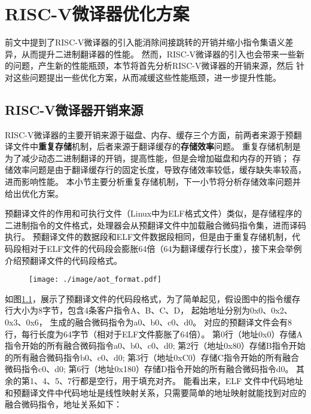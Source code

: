 \chapter{RISC-V微译器优化方案}\label{chap:Opt}

前文中提到了RISC-V微译器的引入能消除间接跳转的开销并缩小指令集语义差异，从而提升二进制翻译器的性能。
然而，RISC-V微译器的引入也会带来一些新的问题，产生新的性能瓶颈，本节将首先分析RISC-V微译器的开销来源，然后
针对这些问题提出一些优化方案，从而减缓这些性能瓶颈，进一步提升性能。




\section{RISC-V微译器开销来源}
RISC-V微译器的主要开销来源于磁盘、内存、缓存三个方面，前两者来源于预翻译文件中\textbf{重复存储}机制，后者来源于翻译缓存的\textbf{存储效率}问题。
重复存储机制是为了减少动态二进制翻译的开销，提高性能，但是会增加磁盘和内存的开销；
存储效率问题是由于翻译缓存行的固定长度，导致存储效率较低，缓存缺失率较高，进而影响性能。
本小节主要分析重复存储机制，下一小节将分析存储效率问题并给出优化方案。

预翻译文件的作用和可执行文件（Linux中为ELF格式文件）类似，是存储程序的二进制指令的文件格式，处理器会从预翻译文件中加载融合微码指令集，进而译码执行。
预翻译文件的数据段和ELF文件数据段相同，但是由于重复存储机制，代码段相对于ELF文件的代码段会膨胀64倍（64为翻译缓存行长度），接下来会举例介绍预翻译文件的代码段格式。

\begin{figure}[!htbp]
  \centering
  \texttt{[image: ./image/aot\_format.pdf]}
  \label{img:aot_format}
\end{figure}

如图\ref{img:aot_format}，展示了预翻译文件的代码段格式，为了简单起见，假设图中的指令缓存行大小为8字节，包含4条客户指令A、B、C、D，
起始地址分别为0x0、0x2、0x3、0x6，
生成的融合微码指令为a0、b0、c0、d0。
对应的预翻译文件会有8行，每行长度为64字节（相对于ELF文件膨胀了64倍）。
第0行（地址0x0）存储A指令开始的所有融合微码指令a0、b0、c0、d0;
第2行（地址0x80）存储B指令开始的所有融合微码指令b0、c0、d0;
第3行（地址0xC0）存储C指令开始的所有融合微码指令c0、d0;
第6行（地址0x180）存储D指令开始的所有融合微码指令d0。
其余的第1、4、5、7行都是空行，用于填充对齐。
能看出来，ELF 文件中代码地址和预翻译文件中代码地址是线性映射关系，只需要简单的地址映射就能找到对应的融合微码指令，地址关系如下：

